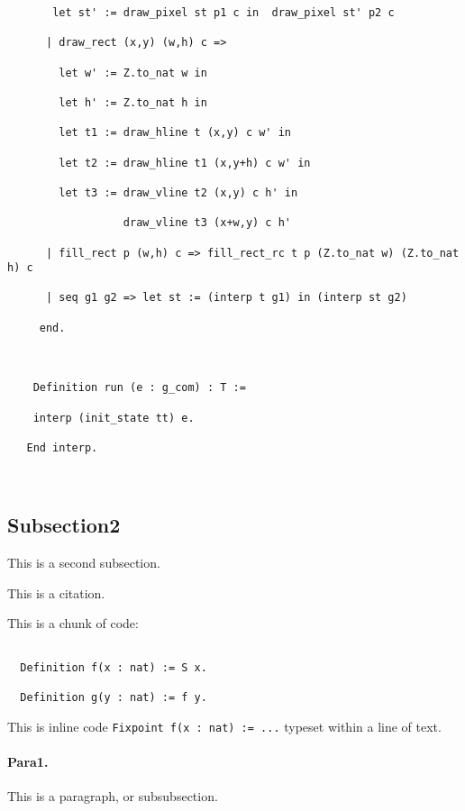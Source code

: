 \documentclass{llncs}
\begin{document}
\begin{lstlisting}
       let st' := draw_pixel st p1 c in  draw_pixel st' p2 c

      | draw_rect (x,y) (w,h) c =>

        let w' := Z.to_nat w in

        let h' := Z.to_nat h in

        let t1 := draw_hline t (x,y) c w' in

        let t2 := draw_hline t1 (x,y+h) c w' in

        let t3 := draw_vline t2 (x,y) c h' in

                  draw_vline t3 (x+w,y) c h'

      | fill_rect p (w,h) c => fill_rect_rc t p (Z.to_nat w) (Z.to_nat h) c

      | seq g1 g2 => let st := (interp t g1) in (interp st g2)

     end.

  

    Definition run (e : g_com) : T :=

    interp (init_state tt) e.

   End interp.



 \end{lstlisting}





\subsection{Subsection2} This is a second subsection.



This is a citation.~\cite{gennaro2010non}



This is a chunk of code:

\begin{lstlisting}

  Definition f(x : nat) := S x.

  Definition g(y : nat) := f y.

\end{lstlisting}



This is inline code \lstinline|Fixpoint f(x : nat) := ...| typeset within a line of text.



\paragraph{Para1.} This is a paragraph, or subsubsection.
\end{document}
